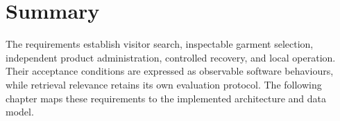 \section{Summary}
The requirements establish visitor search, inspectable garment selection,
independent product administration, controlled recovery, and local operation.
Their acceptance conditions are expressed as observable software behaviours,
while retrieval relevance retains its own evaluation protocol. The following
chapter maps these requirements to the implemented architecture and data model.
